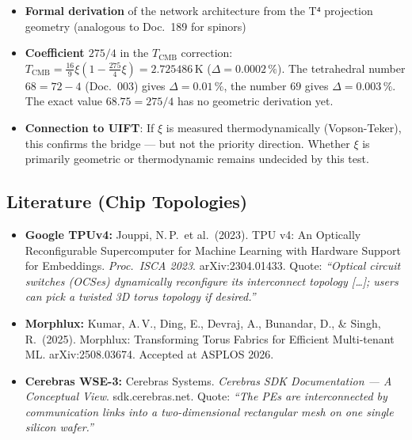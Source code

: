 \begin{itemize}
  \item \textbf{Formal derivation} of the network architecture from the
        T⁴ projection geometry (analogous to Doc.~189 for spinors)

  \item \textbf{Coefficient $275/4$} in the $T_\text{CMB}$ correction:
        $T_\text{CMB} = \tfrac{16}{9}\xi(1 - \tfrac{275}{4}\xi) = 2.725486\,\text{K}$
        ($\Delta = 0.0002\,\%$). The tetrahedral number $68 = 72-4$ (Doc.~003) gives
        $\Delta = 0.01\,\%$, the number $69$ gives $\Delta = 0.003\,\%$.
        The exact value $68.75 = 275/4$ has no geometric derivation yet.

  \item \textbf{Connection to UIFT}: If $\xi$ is measured thermodynamically
        (Vopson-Teker), this confirms the bridge --- but not the priority direction.
        Whether $\xi$ is primarily geometric or thermodynamic remains undecided
        by this test.
\end{itemize}

\subsection*{Literature (Chip Topologies)}

\begin{itemize}\small
  \item \textbf{Google TPUv4:} Jouppi, N.\,P.\ et al.\ (2023).
        TPU v4: An Optically Reconfigurable Supercomputer for Machine
        Learning with Hardware Support for Embeddings.
        \textit{Proc.\ ISCA 2023}. arXiv:2304.01433.
        Quote: \textit{``Optical circuit switches (OCSes) dynamically
        reconfigure its interconnect topology [\ldots]; users can pick
        a twisted 3D torus topology if desired.''}

  \item \textbf{Morphlux:} Kumar, A.\,V., Ding, E., Devraj, A.,
        Bunandar, D., \& Singh, R.\ (2025).
        Morphlux: Transforming Torus Fabrics for Efficient
        Multi-tenant ML. arXiv:2508.03674. Accepted at ASPLOS 2026.

  \item \textbf{Cerebras WSE-3:} Cerebras Systems.
        \textit{Cerebras SDK Documentation --- A Conceptual View}.
        sdk.cerebras.net. Quote: \textit{``The PEs are interconnected
        by communication links into a two-dimensional rectangular
        mesh on one single silicon wafer.''}
\end{itemize}


